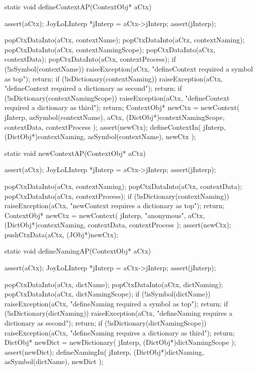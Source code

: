 \startCCode
static void defineContextAP(ContextObj* aCtx) {
  assert(aCtx);
  JoyLoLInterp *jInterp = aCtx->jInterp;
  assert(jInterp);
  
  popCtxDataInto(aCtx, contextName);
  popCtxDataInto(aCtx, contextNaming);
  popCtxDataInto(aCtx, contextNamingScope);
  popCtxDataInto(aCtx, contextData);
  popCtxDataInto(aCtx, contextProcess);
  if (!isSymbol(contextName)) {
    raiseException(aCtx,
      "defineContext required a symbol as top");
    return;
  }
  if (!isDictionary(contextNaming)) {
    raiseException(aCtx,
      "defineContext required a dictionary as second");
    return;
  }
  if (!isDictionary(contextNamingScope)) {
    raiseException(aCtx,
      "defineContext required a dictionary as third");
    return;
  }
  ContextObj* newCtx = newContext(
    jInterp,
    asSymbol(contextName),
    aCtx,
    (DictObj*)contextNamingScope,
    contextData,
    contextProcess
  );
  assert(newCtx);
  defineContextIn(
    jInterp,
    (DictObj*)contextNaming,
    asSymbol(contextName),
    newCtx
  );
}
\stopCCode

\startCCode
static void newContextAP(ContextObj* aCtx) {
  assert(aCtx);
  JoyLoLInterp *jInterp = aCtx->jInterp;
  assert(jInterp);

  popCtxDataInto(aCtx, contextNaming);
  popCtxDataInto(aCtx, contextData);
  popCtxDataInto(aCtx, contextProcess);
  if (!isDictionary(contextNaming)) {
    raiseException(aCtx,
      "newContext requires a dictionary as top");
    return;
  }
  ContextObj* newCtx = newContext(
    jInterp,
    "anonymous",
    aCtx,
    (DictObj*)contextNaming,
    contextData,
    contextProcess
  );
  assert(newCtx);
  pushCtxData(aCtx, (JObj*)newCtx);
}
\stopCCode

\startCCode
static void defineNamingAP(ContextObj* aCtx) {
  assert(aCtx);
  JoyLoLInterp *jInterp = aCtx->jInterp;
  assert(jInterp);
  
  popCtxDataInto(aCtx, dictName);
  popCtxDataInto(aCtx, dictNaming);
  popCtxDataInto(aCtx, dictNamingScope);
  if (!isSymbol(dictName)) {
    raiseException(aCtx,
      "defineNaming required a symbol as top");
    return;
  }
  if (!isDictionary(dictNaming)) {
    raiseException(aCtx,
      "defineNaming requires a dictionary as second");
    return;
  }
  if (!isDictionary(dictNamingScope)) {
    raiseException(aCtx,
      "defineNaming requires a dictionary as third");
    return;
  }
  DictObj* newDict =
    newDictionary(
      jInterp,
      (DictObj*)dictNamingScope
    );
  assert(newDict);
  defineNamingIn(
    jInterp,
    (DictObj*)dictNaming,
    asSymbol(dictName),
    newDict
  );
}
\stopCCode

